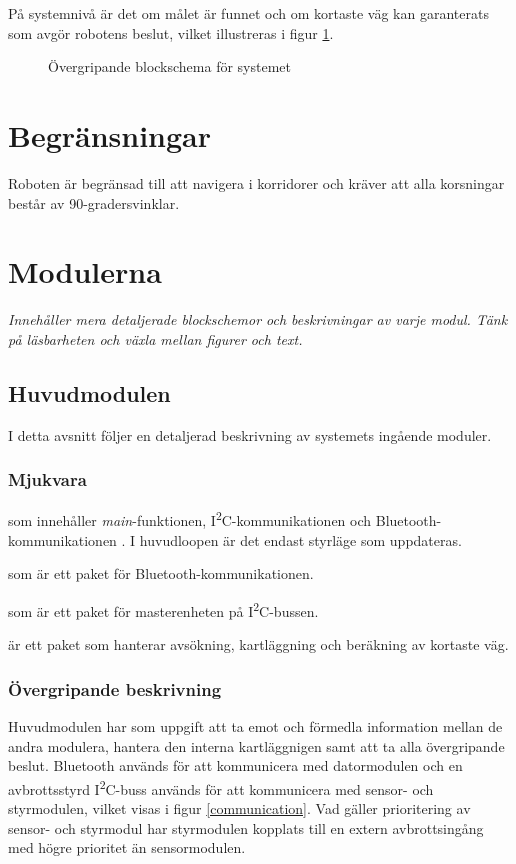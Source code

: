 \documentclass[11pt]{article}
\begin{document}
\begin{flushleft}
På systemnivå är det om målet är funnet och om kortaste väg kan garanterats som avgör robotens beslut, vilket illustreras i figur \ref{blockSystem}.

\begin{figure}[htbp]
\centering
\noindent\resizebox{1\linewidth}{!}{
	}
	\caption{Övergripande blockschema för systemet}	\label{blockSystem}
\end{figure}

\section{Begränsningar}
Roboten är begränsad till att navigera i korridorer och kräver att alla korsningar består av 90-gradersvinklar.

\section{Modulerna}
\textit{Innehåller mera detaljerade blockschemor och beskrivningar av varje modul. Tänk på läsbarheten och växla mellan figurer och text.}

\subsection{Huvudmodulen}
I detta avsnitt följer en detaljerad beskrivning av systemets ingående moduler. 

\subsubsection{Mjukvara}
\begin{description}[style=unboxed, leftmargin=0cm]
  \item[huvudMain.c] som innehåller \textit{main}-funktionen, I\textsuperscript{2}C-kommunikationen och Bluetooth\textsuperscript{\circledR}-kommunikationen . I huvudloopen är det endast styrläge som uppdateras.
  \item[bluetooth.h] som är ett paket för Bluetooth\textsuperscript{\circledR}-kommunikationen.
  \item[I2C\_master.h] som är ett paket för masterenheten på I\textsuperscript{2}C-bussen.
  \item[searchPath.h] är ett paket som hanterar avsökning, kartläggning och beräkning av kortaste väg.
\end{description}


\subsubsection{Övergripande beskrivning}
Huvudmodulen har som uppgift att ta emot och förmedla information mellan de andra modulera, hantera den interna kartläggnigen samt att ta alla övergripande beslut. Bluetooth\textsuperscript{\circledR} används för att kommunicera med datormodulen och en avbrottsstyrd I\textsuperscript{2}C-buss används för att kommunicera med sensor- och styrmodulen, vilket visas i figur \ref{communication}. Vad gäller prioritering av sensor- och styrmodul har styrmodulen kopplats till en extern avbrottsingång med högre prioritet än sensormodulen.


\end{flushleft}
\end{document}

